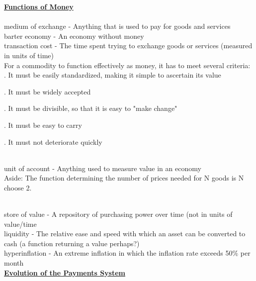 \documentclass[12pt]{article}
\begin{document}
\noindent \underline{\bf Functions of Money}\\

\\

\noindent medium of exchange - Anything that is used to pay for goods and services\\

\noindent barter economy - An economy without money\\

\noindent transaction cost - The time spent trying to exchange goods or services (measured in units of time)\\

\noindent For a commodity to function effectively as money, it has to meet several criteria: \\

. It must be easily standardized, making it simple to ascertain its value

. It must be widely accepted

. It must be divisible, so that it is easy to "make change"

. It must be easy to carry

. It must not deteriorate quickly

\\

\noindent unit of account - Anything used to measure value in an economy\\

\noindent Aside: The function determining the number of prices needed for N goods is N choose 2.

\\

\noindent store of value - A repository of purchasing power over time (not in units of value/time\\

\noindent liquidity - The relative ease and speed with which an asset can be converted to cash (a function returning a value perhaps?)\\

\noindent hyperinflation - An extreme inflation in which the inflation rate exceeds 50$\%$ per month\\

\noindent \underline{\bf Evolution of the Payments System}\\
\end{document}
